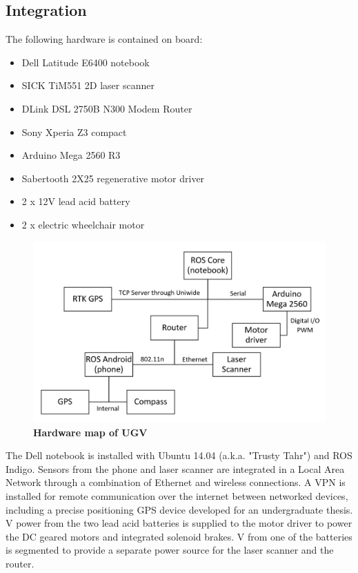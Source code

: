 \documentclass[titlepage,12pt,a4paper]{article}
\begin{document}
\pagebreak


\subsection{Integration}

The following hardware is contained on board:

\begin{itemize}
	\item Dell Latitude E6400 notebook
	\item SICK TiM551 2D laser scanner
	\item DLink DSL 2750B N300 Modem Router
	\item Sony Xperia Z3 compact
	\item Arduino Mega 2560 R3
	\item Sabertooth 2X25 regenerative motor driver
	\item 2 x 12V lead acid battery
	\item 2 x electric wheelchair motor
\end{itemize}

\begin{figure}[h!]
	\centering
	\includegraphics[scale=0.6]{figures/hardware_chart.png}
	\caption{\textbf{Hardware map of UGV}}
	\label{figure:hardware_chart}
\end{figure}

The Dell notebook is installed with Ubuntu 14.04 (a.k.a. "Trusty Tahr") and ROS Indigo. Sensors from the phone and laser scanner are integrated in a Local Area Network through a combination of Ethernet and wireless connections. A VPN is installed for remote communication over the internet between networked devices, including a precise positioning GPS device developed for an undergraduate thesis. \unit[24]{V} power from the two lead acid batteries is supplied to the motor driver to power the DC geared motors and integrated solenoid brakes. \unit[12]{V} from one of the batteries is segmented to provide a separate power source for the laser scanner and the router.
\end{document}
